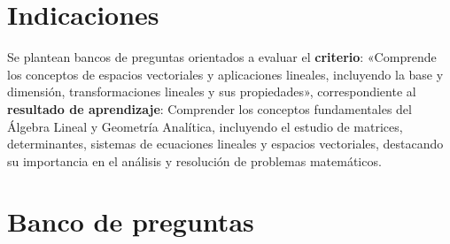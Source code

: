 \documentclass[a4,11pt]{aleph-notas}
\begin{document}
\encabezado

\vspace*{-8mm}
\tableofcontents

\section{Indicaciones}

Se plantean bancos de preguntas orientados a evaluar el \textbf{criterio}: «Comprende los conceptos de espacios vectoriales y aplicaciones lineales, incluyendo la base y dimensión, transformaciones lineales y sus propiedades», correspondiente al \textbf{resultado de aprendizaje}: Comprender los conceptos fundamentales del Álgebra Lineal y Geometría Analítica, incluyendo el estudio de matrices, determinantes, sistemas de ecuaciones lineales y espacios vectoriales, destacando su importancia en el análisis y resolución de problemas matemáticos.

\section{Banco de preguntas}

\end{document}

